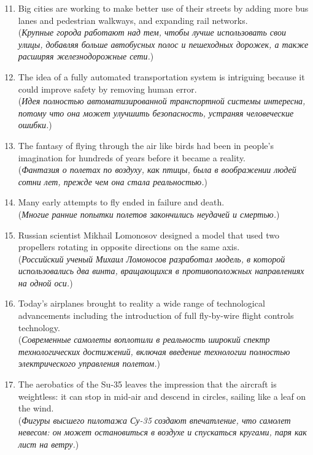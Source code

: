 \begin{enumerate}
      \setcounter{enumi}{10}
      \item Big cities are working to make better use of their streets by adding more bus lanes and pedestrian walkways, and expanding rail networks.\\
            (\textit{Крупные города работают над тем, чтобы лучше использовать свои улицы, добавляя больше автобусных полос и пешеходных дорожек, а также расширяя железнодорожные сети.})

      \item The idea of a fully automated transportation system is intriguing because it could improve safety by removing human error.\\
            (\textit{Идея полностью автоматизированной транспортной системы интересна, потому что она может улучшить безопасность, устраняя человеческие ошибки.})

      \item The fantasy of flying through the air like birds had been in people’s imagination for hundreds of years before it became a reality.\\
            (\textit{Фантазия о полетах по воздуху, как птицы, была в воображении людей сотни лет, прежде чем она стала реальностью.})

      \item Many early attempts to fly ended in failure and death.\\
            (\textit{Многие ранние попытки полетов закончились неудачей и смертью.})

      \item Russian scientist Mikhail Lomonosov designed a model that used two propellers rotating in opposite directions on the same axis.\\
            (\textit{Российский ученый Михаил Ломоносов разработал модель, в которой использовались два винта, вращающихся в противоположных направлениях на одной оси.})

      \item Today’s airplanes brought to reality a wide range of technological advancements including the introduction of full fly-by-wire flight controls technology.\\
            (\textit{Современные самолеты воплотили в реальность широкий спектр технологических достижений, включая введение технологии полностью электрического управления полетом.})

      \item The aerobatics of the Su-35 leaves the impression that the aircraft is weightless: it can stop in mid-air and descend in circles, sailing like a leaf on the wind.\\
            (\textit{Фигуры высшего пилотажа Су-35 создают впечатление, что самолет невесом: он может остановиться в воздухе и спускаться кругами, паря как лист на ветру.})


\end{enumerate}
